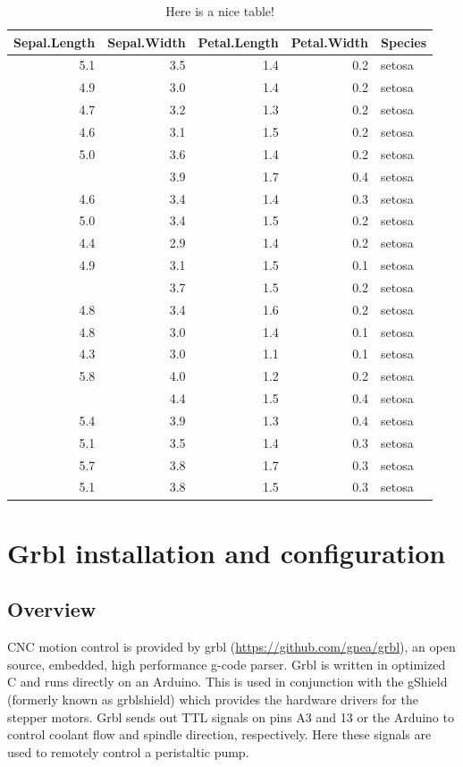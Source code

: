 \documentclass[]{book}
\theoremstyle{definition}
\theoremstyle{definition}
\theoremstyle{remark}
\begin{document}
\begin{table}

\caption{\label{tab:nice-tab}Here is a nice table!}
\centering
\begin{tabular}[t]{rrrrl}
\toprule
Sepal.Length & Sepal.Width & Petal.Length & Petal.Width & Species\\
\midrule
5.1 & 3.5 & 1.4 & 0.2 & setosa\\
4.9 & 3.0 & 1.4 & 0.2 & setosa\\
4.7 & 3.2 & 1.3 & 0.2 & setosa\\
4.6 & 3.1 & 1.5 & 0.2 & setosa\\
5.0 & 3.6 & 1.4 & 0.2 & setosa\\
\addlinespace
5.4 & 3.9 & 1.7 & 0.4 & setosa\\
4.6 & 3.4 & 1.4 & 0.3 & setosa\\
5.0 & 3.4 & 1.5 & 0.2 & setosa\\
4.4 & 2.9 & 1.4 & 0.2 & setosa\\
4.9 & 3.1 & 1.5 & 0.1 & setosa\\
\addlinespace
5.4 & 3.7 & 1.5 & 0.2 & setosa\\
4.8 & 3.4 & 1.6 & 0.2 & setosa\\
4.8 & 3.0 & 1.4 & 0.1 & setosa\\
4.3 & 3.0 & 1.1 & 0.1 & setosa\\
5.8 & 4.0 & 1.2 & 0.2 & setosa\\
\addlinespace
5.7 & 4.4 & 1.5 & 0.4 & setosa\\
5.4 & 3.9 & 1.3 & 0.4 & setosa\\
5.1 & 3.5 & 1.4 & 0.3 & setosa\\
5.7 & 3.8 & 1.7 & 0.3 & setosa\\
5.1 & 3.8 & 1.5 & 0.3 & setosa\\
\bottomrule
\end{tabular}
\end{table}

\chapter{Grbl installation and
configuration}\label{grbl-installation-and-configuration}

\section{Overview}\label{overview-1}

CNC motion control is provided by grbl
(\url{https://github.com/gnea/grbl}), an open source, embedded, high
performance g-code parser. Grbl is written in optimized C and runs
directly on an Arduino. This is used in conjunction with the gShield
(formerly known as grblshield) which provides the hardware drivers for
the stepper motors. Grbl sends out TTL signals on pins A3 and 13 or the
Arduino to control coolant flow and spindle direction, respectively.
Here these signals are used to remotely control a peristaltic pump.
\end{document}
